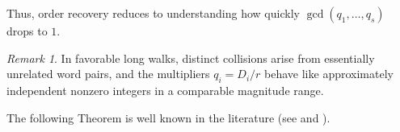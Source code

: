 \documentclass[11pt,reqno]{article}
\numberwithin{equation}{section}
\theoremstyle{plain}
\newtheorem{lemma}[theorem]{Lemma}
\theoremstyle{definition}
\theoremstyle{remark}
\newtheorem{remark}[theorem]{Remark}
\begin{document}
Thus, order recovery reduces to understanding how quickly $\gcd(q_1,\dots,q_s)$ drops to $1$.

\begin{remark}\label{heur:indep-clean}
In favorable long walks, distinct collisions arise from essentially unrelated word pairs,
and the multipliers $q_i=D_i/r$ behave like approximately independent nonzero integers in a
comparable magnitude range.
\end{remark}
The following Theorem is well known in the literature (see \cite{Nym72} and \cite{Leh00}).

\end{document}
